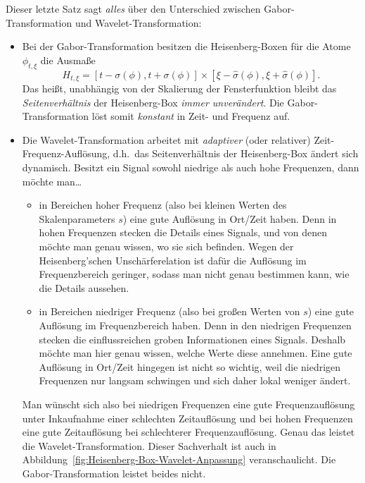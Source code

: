 \begin{remark}
Dieser letzte Satz sagt \emph{alles} über den Unterschied zwischen Gabor-Transformation und
Wavelet-Transformation:
\begin{itemize}
\item Bei der Gabor-Transformation besitzen die Heisenberg-Boxen für die Atome $ \phi_{t,\xi} $ die
  Ausmaße
  \[
    H_{t,\xi} = [t - \sigma(\phi), t + \sigma(\phi)] \times
                [\xi - \widehat{\sigma}(\phi), \xi + \widehat{\sigma}(\phi)].
  \]
  Das heißt, unabhängig von der Skalierung der Fensterfunktion bleibt das 
  \emph{Seitenverhältnis} der Heisenberg-Box \emph{immer unverändert}. Die Gabor-Transformation 
  löst somit \emph{konstant} in Zeit- und Frequenz auf.
\item Die Wavelet-Transformation arbeitet mit \emph{adaptiver} (oder relativer)
  Zeit-Frequenz-Auflösung, d.h.\ das Seitenverhältnis der Heisenberg-Box ändert sich dynamisch.
  Besitzt ein Signal sowohl niedrige als auch hohe Frequenzen, dann möchte man\dots
  \begin{itemize}
  \item in Bereichen hoher Frequenz (also bei kleinen Werten des Skalenparameters $ s $) eine gute 
    Auflösung in Ort/Zeit haben. Denn in hohen Frequenzen stecken die Details eines Signals, und
    von denen möchte man genau wissen, wo sie sich befinden. Wegen der Heisenberg'schen
    Unschärferelation ist dafür die Auflösung im Frequenzbereich geringer, sodass man nicht genau 
    bestimmen kann, wie die Details aussehen.
  \item in Bereichen niedriger Frequenz (also bei großen Werten von $ s $) eine gute Auflösung
    im Frequenzbereich haben. Denn in den niedrigen Frequenzen stecken die einflussreichen groben 
    Informationen eines Signals. Deshalb möchte man hier genau wissen, welche Werte diese annehmen.
    Eine gute Auflösung in Ort/Zeit hingegen ist nicht so wichtig, weil die niedrigen Frequenzen
    nur langsam schwingen und sich daher lokal weniger ändert.
  \end{itemize}
  Man wünscht sich also bei niedrigen Frequenzen eine gute Frequenzauflösung unter Inkaufnahme 
  einer schlechten Zeitauflösung und bei hohen Frequenzen eine gute Zeitauflösung bei schlechterer 
  Frequenzauflösung. Genau das leistet die Wavelet-Transformation. Dieser Sachverhalt ist auch in
  Abbildung~\ref{fig:Heisenberg-Box-Wavelet-Anpassung} veranschaulicht. Die Gabor-Transformation 
  leistet beides nicht.
  \begin{figure}[ht]
  \centering
\end{figure}
\end{itemize}
\end{remark}
